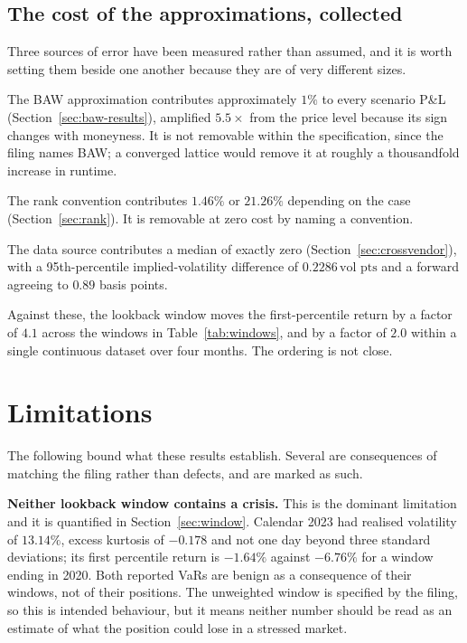 \documentclass[11pt]{article}
\newcommand{\vp}{\,\text{vol pts}}
\begin{document}
\subsection{The cost of the approximations, collected}

Three sources of error have been measured rather than assumed, and it is worth setting
them beside one another because they are of very different sizes.

The BAW approximation contributes approximately $1\%$ to every scenario P\&L
(Section~\ref{sec:baw-results}), amplified $5.5\times$ from the price level because its
sign changes with moneyness. It is not removable within the specification, since the
filing names BAW; a converged lattice would remove it at roughly a thousandfold increase
in runtime.

The rank convention contributes $1.46\%$ or $21.26\%$ depending on the case
(Section~\ref{sec:rank}). It is removable at zero cost by naming a convention.

The data source contributes a median of exactly zero (Section~\ref{sec:crossvendor}),
with a 95th-percentile implied-volatility difference of $0.2286\vp$ and a forward
agreeing to $0.89$ basis points.

Against these, the lookback window moves the first-percentile return by a factor of
$4.1$ across the windows in Table~\ref{tab:windows}, and by a factor of $2.0$ within a
single continuous dataset over four months. The ordering is not close.

\section{Limitations}
\label{sec:limitations}

The following bound what these results establish. Several are consequences of matching
the filing rather than defects, and are marked as such.

\textbf{Neither lookback window contains a crisis.} This is the dominant limitation and
it is quantified in Section~\ref{sec:window}. Calendar 2023 had realised volatility of
$13.14\%$, excess kurtosis of $-0.178$ and not one day beyond three standard deviations;
its first percentile return is $-1.64\%$ against $-6.76\%$ for a window ending in 2020.
Both reported VaRs are benign as a consequence of their windows, not of their positions.
The unweighted window is specified by the filing, so this is intended behaviour, but it
means neither number should be read as an estimate of what the position could lose in a
stressed market.
\end{document}
